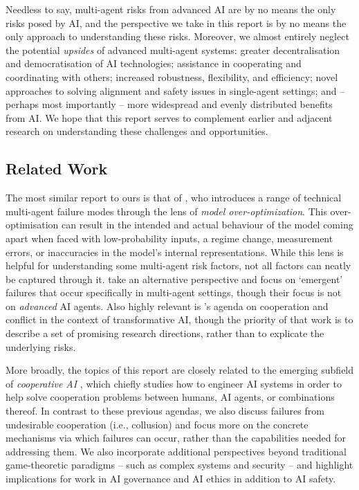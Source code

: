 Needless to say, multi-agent risks from advanced AI are by no means the only risks posed by AI, and the perspective we take in this report is by no means the only approach to understanding these risks.
Moreover, we almost entirely neglect the potential \textit{upsides} of advanced multi-agent systems:
greater decentralisation and democratisation of AI technologies;
assistance in cooperating and coordinating with others;
increased robustness, flexibility, and efficiency; 
novel approaches to solving alignment and safety issues in single-agent settings; 
and -- perhaps most importantly -- more widespread and evenly distributed benefits from AI. 
We hope that this report serves to complement earlier and adjacent research on understanding these challenges and opportunities.


\subsection{Related Work}

The most similar report to ours is that of \citet{Manheim2019}, who introduces a range of technical multi-agent failure modes through the lens of \emph{model over-optimization}. This over-optimisation can result in the intended and actual behaviour of the model coming apart when faced with low-probability inputs, a regime change, measurement errors, or inaccuracies in the model's internal representations. While this lens is helpful for understanding some multi-agent risk factors, not all factors can neatly be captured through it.
\citet{Mogul2006,Altmann2024} take an alternative perspective and focus on `emergent' failures that occur specifically in multi-agent settings, though their focus is not on \textit{advanced} AI agents.
Also highly relevant is \citet{Clifton2020}'s agenda on cooperation and conflict in the context of transformative AI, though the priority of that work is to describe a set of promising research directions, rather than to explicate the underlying risks. 

More broadly, the topics of this report are closely related to the emerging subfield of \emph{cooperative AI} \citep{Dafoe2020,Bertino2020,dafoe2021cooperative,Conitzer2023}, which chiefly studies how to engineer AI systems in order to help solve cooperation problems between humans, AI agents, or combinations thereof.
In contrast to these previous agendas, we also discuss failures from undesirable cooperation (i.e., collusion) and focus more on the concrete mechanisms via which failures can occur, rather than the capabilities needed for addressing them.
We also incorporate additional perspectives beyond traditional game-theoretic paradigms -- such as complex systems and security -- and highlight implications for work in AI governance and AI ethics in addition to AI safety.

